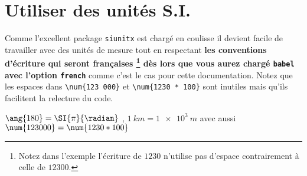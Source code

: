 \documentclass[12pt,a4paper]{article}
\begin{document}
\section{Utiliser des unités S.I.}

Comme l'excellent package \verb#siunitx# est chargé en coulisse il devient facile de travailler avec des unités de mesure tout en respectant
\textbf{%
les conventions d'écriture qui seront françaises
	\footnote{
		Notez dans l'exemple l'écriture de $\num{1230}$ n'utilise pas d'espace contrairement à celle de $\num{12300}$.
	}
dès lors que vous aurez chargé \texttt{babel} avec l'option \texttt{french}%
} comme c'est le cas pour cette documentation.
Notez que les espaces dans \verb#\num{123 000}# et \verb#\num{1230 * 100}# sont inutiles mais qu'ils facilitent la relecture du code.

\begin{latexex}
$\ang{180} = \SI{\pi}{\radian}$ ,
$\SI{1}{km} = \SI{1e3}{m}$ avec aussi
$\num{123 000} = \num{1230 * 100}$
\end{latexex}
\end{document}
